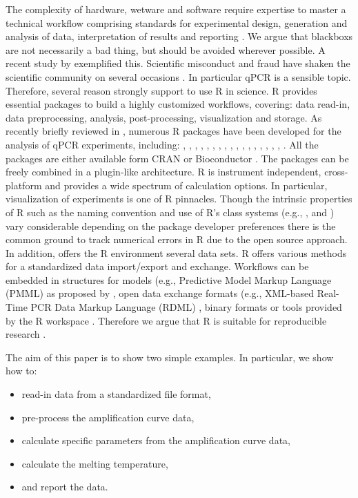 The complexity of hardware, wetware and software require expertise to master a 
technical workflow comprising standards for experimental design, generation and 
analysis of data, interpretation of results and reporting 
\citep{huggett_BDQ_2014}. We argue that blackboxs are not necessarily a bad 
thing, but should be avoided wherever possible. A recent study by 
\citet{Duran_2014} exemplified this. Scientific misconduct and fraud have shaken 
the scientific community on several occasions \citep{fang_2012}. In particular 
qPCR is a sensible topic. Therefore, several reason strongly support to use R in 
science. R provides essential packages to build a highly customized workflows, 
covering: data read-in, data preprocessing, analysis, post-processing, 
visualization and storage. As recently briefly reviewed in 
\citet{pabinger_2014}, numerous R packages have been developed for the analysis 
of qPCR experiments, including: , , 
, , , , 
, , , , 
, , , , 
, , , 
. All the packages are either available form CRAN or 
Bioconductor \citep{gentleman_2004}. The packages can be freely combined in a 
plugin-like architecture. R is instrument independent, cross-platform and 
provides a wide spectrum of calculation options. In particular, visualization of 
experiments is one of R pinnacles. Though the intrinsic properties of R such as 
the naming convention \citep{Baaaath_2012} and use of R's class systems (e.g., 
,  and ) vary considerable depending on the 
package developer preferences there is the common ground to track numerical 
errors in R due to the open source approach. In addition, offers the R 
environment several data sets. R offers various methods for a standardized data 
import/export and exchange. Workflows can be embedded in structures for models 
(e.g., Predictive Model Markup Language (PMML) as proposed by 
\citet{Guazzelli_2009}, open data exchange formats (e.g., XML-based Real-Time 
PCR Data Markup Language (RDML) \citep{lefever_2009}, binary formats 
\citep{michna_2013} or tools provided by the R workspace \citep{RDCT2010c}. 
Therefore we argue that R is suitable for reproducible research 
\citep{Gesmann_2011, Murrell_2012, gandrud_2013, hofmann_2013, Leeper_2014, 
liu_2014}.

The aim of this paper is to show two simple examples. In 
particular, we show how to:
\begin{itemize}
 \item read-in data from a standardized file format,
 \item pre-process the amplification curve data,
 \item calculate specific parameters from the amplification curve data,
 \item calculate the melting temperature,
 \item and report the data.
\end{itemize}

